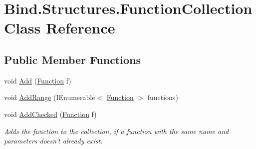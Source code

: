 \hypertarget{class_bind_1_1_structures_1_1_function_collection}{
\section{Bind.Structures.FunctionCollection Class Reference}
\label{class_bind_1_1_structures_1_1_function_collection}
}
\subsection*{Public Member Functions}
\begin{DoxyCompactItemize}
\item 
void \hyperlink{class_bind_1_1_structures_1_1_function_collection_a1165343880626e19a0e8de6f0f16edaa}{Add} (\hyperlink{class_bind_1_1_structures_1_1_function}{Function} f)
\item 
void \hyperlink{class_bind_1_1_structures_1_1_function_collection_a10193c2b7d2ccce61f88a78fdbd5086b}{AddRange} (IEnumerable$<$ \hyperlink{class_bind_1_1_structures_1_1_function}{Function} $>$ functions)
\item 
void \hyperlink{class_bind_1_1_structures_1_1_function_collection_ad4ef5be45e38acdb26f4c39c98d45f11}{AddChecked} (\hyperlink{class_bind_1_1_structures_1_1_function}{Function} f)
\begin{DoxyCompactList}\small\item\em Adds the function to the collection, if a function with the same name and parameters doesn't already exist. \item\end{DoxyCompactList}\end{DoxyCompactItemize}


